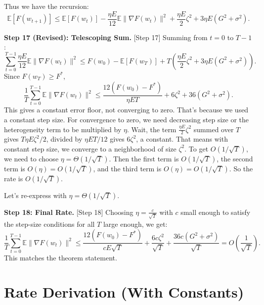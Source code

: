 \documentclass{article}
\begin{document}
Thus we have the recursion:
\begin{equation}
    \mathbb{E}[F(w_{t+1})] \leq \mathbb{E}[F(w_t)] - \frac{\eta E}{12} \mathbb{E} \| \nabla F(w_t) \|^2 + \frac{\eta E}{2} \zeta^2 + 3 \eta E (G^2 + \sigma^2).
\end{equation}

\textbf{Step 17 (Revised): Telescoping Sum.} [Step 17]
Summing from $t=0$ to $T-1$:
\begin{equation}
    \sum_{t=0}^{T-1} \frac{\eta E}{12} \mathbb{E} \| \nabla F(w_t) \|^2 \leq F(w_0) - \mathbb{E}[F(w_T)] + T \left( \frac{\eta E}{2} \zeta^2 + 3 \eta E (G^2 + \sigma^2) \right).
\end{equation}
Since $F(w_T) \geq F^*$,
\begin{equation}
    \frac{1}{T} \sum_{t=0}^{T-1} \mathbb{E} \| \nabla F(w_t) \|^2 \leq \frac{12(F(w_0) - F^*)}{\eta E T} + 6 \zeta^2 + 36 (G^2 + \sigma^2).
\end{equation}
This gives a constant error floor, not converging to zero. That's because we used a constant step size. For convergence to zero, we need decreasing step size or the heterogeneity term to be multiplied by $\eta$. Wait, the term $\frac{\eta E}{2} \zeta^2$ summed over $T$ gives $T \eta E \zeta^2 / 2$, divided by $\eta E T / 12$ gives $6 \zeta^2$, a constant. That means with constant step size, we converge to a neighborhood of size $\zeta^2$. To get $O(1/\sqrt{T})$, we need to choose $\eta = \Theta(1/\sqrt{T})$. Then the first term is $O(1/\sqrt{T})$, the second term is $O(\eta) = O(1/\sqrt{T})$, and the third term is $O(\eta) = O(1/\sqrt{T})$. So the rate is $O(1/\sqrt{T})$.

Let's re-express with $\eta = \Theta(1/\sqrt{T})$.

\textbf{Step 18: Final Rate.} [Step 18]
Choosing $\eta = \frac{c}{\sqrt{T}}$ with $c$ small enough to satisfy the step-size conditions for all $T$ large enough, we get:
\begin{equation}
    \frac{1}{T} \sum_{t=0}^{T-1} \mathbb{E} \| \nabla F(w_t) \|^2 \leq \frac{12(F(w_0) - F^*)}{c E \sqrt{T}} + \frac{6 c \zeta^2}{\sqrt{T}} + \frac{36 c (G^2 + \sigma^2)}{\sqrt{T}} = O\left(\frac{1}{\sqrt{T}}\right).
\end{equation}
This matches the theorem statement.

\section*{Rate Derivation (With Constants)}
\end{document}
